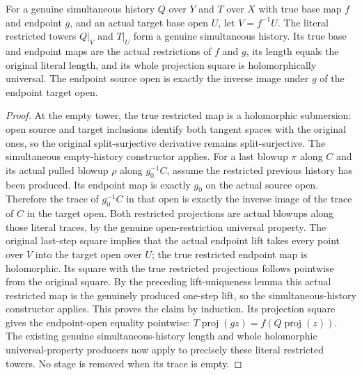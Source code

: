 \begin{lemma}
\label{hir:historical-control-open-history}
\leanok
For a genuine simultaneous history $Q$ over $Y$ and $T$ over $X$ with true base map $f$ and endpoint $g$, and an actual target base open $U$, let $V=f^{-1}U$. The literal restricted towers $Q|_V$ and $T|_U$ form a genuine simultaneous history. Its true base and endpoint maps are the actual restrictions of $f$ and $g$, its length equals the original literal length, and its whole projection square is holomorphically universal. The endpoint source open is exactly the inverse image under $g$ of the endpoint target open.
\end{lemma}
\begin{proof}
At the empty tower, the true restricted map is a holomorphic submersion: open source and target inclusions identify both tangent spaces with the original ones, so the original split-surjective derivative remains split-surjective. The simultaneous empty-history constructor applies. For a last blowup $\pi$ along $C$ and its actual pulled blowup $\rho$ along $g_0^{-1}C$, assume the restricted previous history has been produced. Its endpoint map is exactly $g_0$ on the actual source open. Therefore the trace of $g_0^{-1}C$ in that open is exactly the inverse image of the trace of $C$ in the target open. Both restricted projections are actual blowups along those literal traces, by the genuine open-restriction universal property. The original last-step square implies that the actual endpoint lift takes every point over $V$ into the target open over $U$; the true restricted endpoint map is holomorphic. Its square with the true restricted projections follows pointwise from the original square. By the preceding lift-uniqueness lemma this actual restricted map is the genuinely produced one-step lift, so the simultaneous-history constructor applies. This proves the claim by induction. Its projection square gives the endpoint-open equality pointwise: $T\operatorname{proj}(gz)=f(Q\operatorname{proj}(z))$. The existing genuine simultaneous-history length and whole holomorphic universal-property producers now apply to precisely these literal restricted towers. No stage is removed when its trace is empty.
\end{proof}


